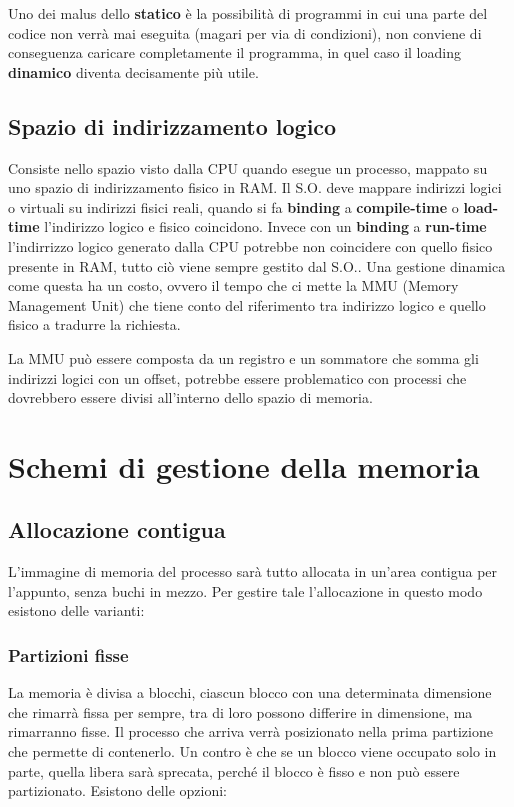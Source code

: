 \documentclass[a4paper, 12pt]{book}
\begin{document}
Uno dei malus dello \textbf{statico} è la possibilità di programmi in cui una parte del codice non verrà mai eseguita (magari
per via di condizioni), non conviene di conseguenza caricare completamente il programma, in quel caso il loading \textbf{dinamico}
diventa decisamente più utile.

\section{Spazio di indirizzamento logico}

Consiste nello spazio visto dalla CPU quando esegue un processo, mappato su uno spazio di indirizzamento fisico in RAM. Il S.O. 
deve mappare indirizzi logici o virtuali su indirizzi fisici reali, quando si fa \textbf{binding} a \textbf{compile-time} o
\textbf{load-time} l'indirizzo logico e fisico coincidono. Invece con un \textbf{binding} a \textbf{run-time} l'indirrizzo
logico generato dalla CPU potrebbe non coincidere con quello fisico presente in RAM, tutto ciò viene sempre gestito dal
S.O.. Una gestione dinamica come questa ha un costo, ovvero il tempo che ci mette la MMU (Memory Management Unit) che tiene 
conto del riferimento tra indirizzo logico e quello fisico a tradurre la richiesta.

La MMU può essere composta da un registro e un sommatore che somma gli indirizzi logici con un offset, potrebbe essere problematico
con processi che dovrebbero essere divisi all'interno dello spazio di memoria.

\chapter{Schemi di gestione della memoria}

\section{Allocazione contigua}

L'immagine di memoria del processo sarà tutto allocata in un'area contigua per l'appunto, senza buchi in mezzo. Per gestire tale
l'allocazione in questo modo esistono delle varianti:

\subsection{Partizioni fisse}

La memoria è divisa a blocchi, ciascun blocco con una determinata
    dimensione che rimarrà fissa per sempre, tra di loro possono differire in dimensione, ma rimarranno fisse. Il processo che arriva
    verrà posizionato nella prima partizione che permette di contenerlo. Un contro è che se un blocco viene occupato solo in 
    parte, quella libera sarà sprecata, perché il blocco è fisso e non può essere partizionato. Esistono delle opzioni:
\end{document}
